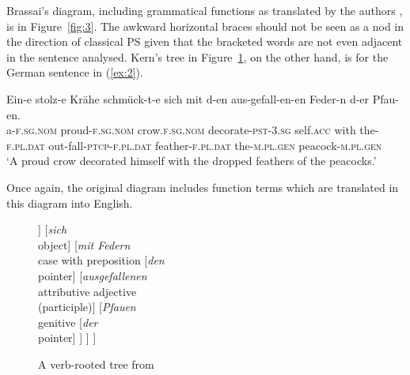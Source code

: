 \documentclass[output=paper]{langscibook}
\begin{document}
Brassai’s diagram, including grammatical functions as translated by the authors \citep{ImrenyiVladarTBA}, is in Figure~\ref{fig:3}. The awkward horizontal braces should not be seen as a nod in the direction of classical PS given that the bracketed words are not even adjacent in the sentence analysed. Kern’s tree in Figure~\ref{fig:4}, on the other hand, is for the German sentence in (\ref{ex:2}).

\ea
\label{ex:2}
\gll Ein-e stolz-e Krähe schmück-t-e sich mit d-en aus-gefall-en-en Feder-n d-er Pfau-en.\\
	a\textsc{-f.sg.nom} proud\textsc{-f.sg.nom} crow\textsc{.f.sg.nom} decorate\textsc{-pst}\textsc{-3.sg} self\textsc{.acc} with the\textsc{-f.pl.dat} out-fall-\textsc{ptcp}-\textsc{f.pl.dat} feather\textsc{-f.pl.dat} the\textsc{-m.pl.gen} peacock-\textsc{m.pl.gen}\\

	\glt ‘A proud crow decorated himself with the dropped feathers of the peacocks.’
\z

Once again, the original diagram includes function terms which are translated in this diagram into English.

\begin{figure}
	\centering
\begin{forest}
[\emph{schmückte}\\finite verb
	[\emph{Krähe}\\subject word
		[\emph{eine}\\counter]
		[\emph{stolze}\\attributive adjective]
	]
	[\emph{sich}\\object]
	[\emph{mit Federn}\\case with preposition
		[\emph{den}\\pointer]
		[\emph{ausgefallenen}\\attributive adjective\\(participle)]
		[\emph{Pfauen}\\genitive
			[\emph{der}\\pointer]
		]
	]
]
\end{forest}
	\caption{A verb-rooted tree from \citealp{Kern1884a-u}}
	\label{fig:4}
\end{figure}
\end{document}
